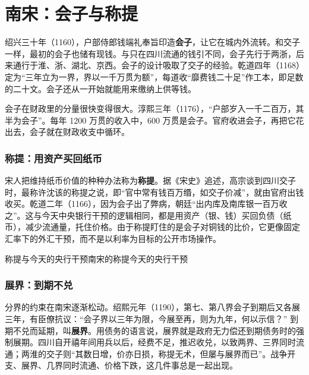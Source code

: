 \section{南宋：会子与称提}\label{sec:songming-huizi}

绍兴三十年（1160），户部侍郎钱端礼奉旨印造\textbf{会子}，让它在城内外流转。和交子一样，最初的会子也储有现钱\cite{songshi}。与只在四川流通的钱引不同，会子先行于两浙，后来通行于淮、浙、湖北、京西。会子的设计吸取了交子的经验。乾道四年（1168）定为“三年立为一界，界以一千万贯为额”，每道收“靡费钱二十足”作工本\cite{songshi}，即足数的二十文。会子还从一开始就能用来缴纳上供等钱。

会子在财政里的分量很快变得很大。淳熙三年（1176），“户部岁入一千二百万，其半为会子”\cite{songshi}。每年 1200 万贯的收入中，600 万贯是会子。官府收进会子，再把它花出去，会子就在财政收支中循环。

\subsubsection{称提：用资产买回纸币}
宋人把维持纸币价值的种种办法称为\textbf{称提}。据《宋史》追述，高宗谈到四川交子时，最称许沈该的称提之说，即“官中常有钱百万缗，如交子价减”，就由官府出钱收买\cite{songshi}。乾道二年（1166），因为会子出了弊病，朝廷“出内库及南库银一百万收之”\cite{songshi}。这与今天中央银行干预的逻辑相同，都是用资产（银、钱）买回负债（纸币），减少流通量，托住价格。由于称提盯住的是会子对铜钱的比价，它更像固定汇率下的外汇干预，而不是以利率为目标的公开市场操作。

\begin{compare}{称提与今天的央行干预}{南宋的称提}{今天的央行干预}
\end{compare}

\subsubsection{展界：到期不兑}
分界的约束在南宋逐渐松动。绍熙元年（1190），第七、第八界会子到期后又各展三年，有臣僚抗议：“会子界以三年为限，今展至再，则为九年，何以示信？”\cite{songshi} 到期不兑而延期，叫\textbf{展界}。用债务的语言说，展界就是政府无力偿还到期债务时的强制展期。四川自开禧年间用兵以后，经费不足，推迟收兑，以致两界、三界同时流通；两淮的交子则“其数日增，价亦日损，称提无术，但屡与展界而已”\cite{songshi}。战争开支、展界、几界同时流通、价格下跌，这几件事总是一起出现。

